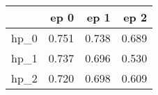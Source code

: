 \begin{tabular}{lrrr}
\toprule
{} &   ep 0 &   ep 1 &   ep 2 \\
\midrule
hp\_0 &  0.751 &  0.738 &  0.689 \\
hp\_1 &  0.737 &  0.696 &  0.530 \\
hp\_2 &  0.720 &  0.698 &  0.609 \\
\bottomrule
\end{tabular}
